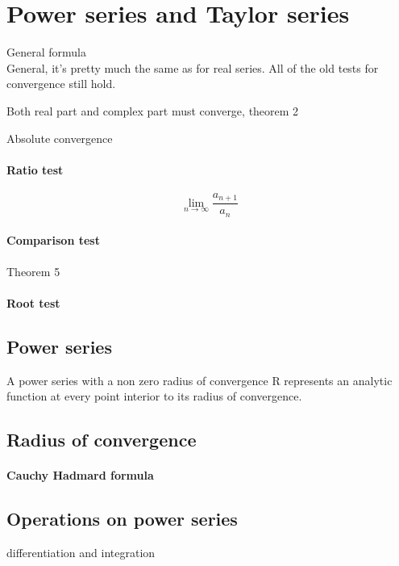 \section{Power series and Taylor series}
General formula \\

General, it's pretty much the same as for real series. All of the old
tests for convergence still hold.

Both real part and complex part must converge, theorem 2

Absolute convergence

\paragraph{Ratio test}

\begin{equation}
    \lim_{n\to\infty}\frac{a_{n+1}}{a_n}
\end{equation}

\paragraph{Comparison test} Theorem 5

\paragraph{Root test}


\subsection{Power series}


A power series with a non zero radius of convergence R represents an
analytic function at every point interior to its radius of
convergence.

\subsection{Radius of convergence}

\paragraph{Cauchy Hadmard formula}

\subsection{Operations on power series}
differentiation and  integration



